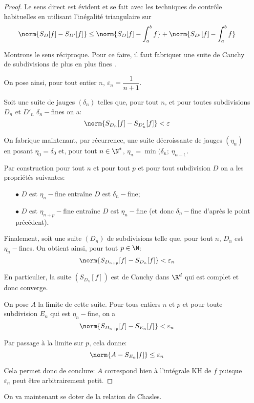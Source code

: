 \begin{proof}
Le sens direct est évident et se fait avec les techniques de contrôle habituelles en utilisant l'inégalité triangulaire sur 
\[
\norm{S_D[f]- S_{D'}[f]} \leq \norm{S_D[f]- \int_a^b f} + \norm{S_{D'}[f]- \int_a^b f}
\]

Montrons le sens réciproque. Pour ce faire, il faut fabriquer une suite de Cauchy de subdivisions \og de plus en plus fines \fg{}. 

On pose ainsi, pour tout entier $n$, $\varepsilon_n = \dfrac{1}{n+1}$. 

Soit une suite de jauges $(\delta_n)$ telles que, pour tout $n$, et pour toutes subdivisions $D_n$ et $D'_n$ $\delta_n-$fines on a:
\[
\norm{S_{D_n}[f]- S_{D_n'}[f]} < \varepsilon
\]

On fabrique maintenant, par récurrence, une suite décroissante de jauges $(\eta_n)$ en posant $\eta_0 = \delta_0$ et, pour tout $n \in \N^*$, $\eta_n = \min(\delta_n;~\eta_{n-1}$.

Par construction pour tout $n$ et pour tout $p$ et pour tout subdivision $D$ on a les propriétés suivantes:
\begin{itemize}
\item[$\bullet$]
$D$ est $\eta_n-$fine entraîne $D$ est $\delta_n-$fine;
\item[$\bullet$]
$D$ est $\eta_{n+p}-$fine entraîne $D$ est $\eta_n-$fine (et donc $\delta_n-$fine d'après le point précédent).
\end{itemize}

Finalement, soit une suite $(D_n)$ de subdivisions telle que, pour tout $n$, $D_n$ est $\eta_n-$fines. On obtient ainsi, pour tout $p \in \N$:
\[
\norm{S_{D_{n+p}}[f]-S_{D_n}[f]} < \varepsilon_n
\]

En particulier, la suite $(S_{D_n}[f])$ est de Cauchy dans $\R^d$ qui est complet et donc converge.

On pose $A$ la limite de cette suite. Pour tous entiers $n$ et $p$ et pour toute subdivision $E_n$ qui est $\eta_n-$fine, on a
\[
\norm{S_{D_{n+p}}[f]-S_{E_n}[f]} < \varepsilon_n
\]

Par passage à la limite sur $p$, cela donne:
\[
\norm{A-S_{E_n}[f]} \leq \varepsilon_n
\]

Cela permet donc de conclure: $A$ correspond bien à l'intégrale KH de $f$ puisque $\varepsilon_n$ peut être arbitrairement petit.
\end{proof}

On va maintenant se doter de la relation de Chasles.

